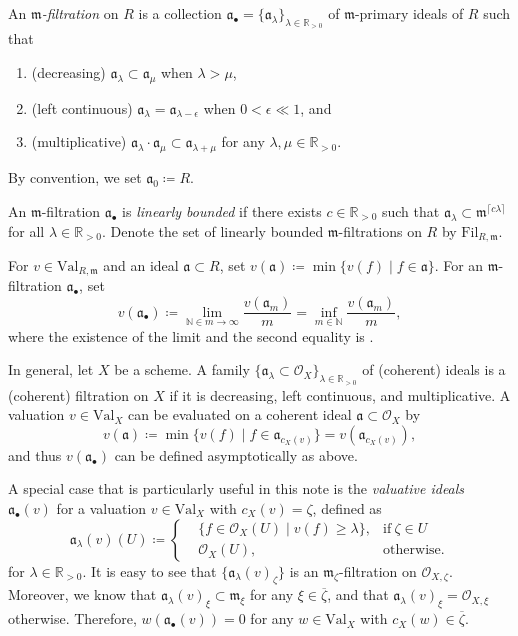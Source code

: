 \documentclass[11pt, leqno]{amsart}%
\theoremstyle{plain}
\theoremstyle{definition}
\newtheorem{definition}[theorem]{Definition}
\theoremstyle{remark}
\newcommand{\cO}{\mathcal{O}}
\newcommand{\bN}{\mathbb{N}}
\newcommand{\bR}{\mathbb{R}}
\newcommand{\fa}{\mathfrak{a}}
\newcommand{\fm}{\mathfrak{m}}
\newcommand{\Val}{\mathrm{Val}}
\newcommand{\R}{\mathbb{R}}
\newcommand{\la}{\lambda}
\newcommand{\Fil}{\mathrm{Fil}}
\begin{document}
An \emph{$\fm$-filtration} on $R$ is a collection $\fa_\bullet =\{\fa_\la \}_{\la \in \R_{>0}}$  of $\fm$-primary ideals of $R$ such that
\begin{enumerate}
\item (decreasing) $\fa_\la \subset \fa_{\mu}$ when  $\la >\mu$,
\item (left continuous) $\fa_{\la} = \fa_{\la-\epsilon}$ when $0<\epsilon\ll1$, and
\item (multiplicative) $\fa_{\la} \cdot \fa_{\mu} \subset \fa_{\la+ \mu}$ for any $\lambda,\mu\in\bR_{>0}$.
\end{enumerate}
By convention, we set $\fa_{0}\coloneqq R$.  

An $\fm$-filtration $\fa_\bullet$ is \emph{linearly bounded} if there exists $c\in\bR_{>0}$ such that $\fa_{\la} \subset \fm^{\lceil c  \la \rceil }$ for all $\la\in \bR_{>0}$. 
Denote the set of linearly bounded $\fm$-filtrations on $R$ by $\Fil_{R,\fm}$. 


For $v\in \Val_{R,\fm}$ and an ideal $\fa\subset R$, set
$v(\fa)\coloneqq \min\{v(f)\mid f\in\fa\}$.
For an $\fm$-filtration $\fa_\bullet$,  set
\[
v(\fa_\bullet)\coloneqq  \lim_{ \bN\in m \to \infty} \frac{ v(\fa_m)}{m} = \inf_{m\in \bN} \frac{v(\fa_m)}{m} , 
\]
where the existence of the limit and the second equality is \cite[Lemma 2.3]{JM-val-ideal-seq}. 


\medskip

In general, let $X$ be a scheme. A family $\{\fa_\lambda\subset\cO_X\}_{\lambda\in\bR_{>0}}$ of (coherent) ideals is a (coherent) filtration on $X$ if it is decreasing, left continuous, and multiplicative. 
A valuation $v\in\Val_X$ can be evaluated on a coherent ideal $\fa\subset \cO_X$ by
\[
    v(\fa)\coloneqq\min\{v(f)\mid f\in\fa_{c_X(v)}\}=v(\fa_{c_X(v)}),
\]
and thus $v(\fa_\bullet)$ can be defined asymptotically as above. 

A special case that is particularly useful in this note is the \emph{valuative ideals} $\fa_\bullet(v)$ for a valuation $v\in\Val_X$ with $c_X(v)=\zeta$, defined as
\[
    \fa_\lambda(v)(U)\coloneqq\left\{\begin{aligned}
        &\{f\in \cO_X(U)\mid v(f)\ge \lambda\}, &\text{if}~ \zeta\in U\\
        &\cO_X(U), &\text{otherwise}.
    \end{aligned}\right.
\]
for $\lambda\in\bR_{>0}$. It is easy to see that $\{\fa_\lambda(v)_\zeta\}$ is an $\fm_\zeta$-filtration on $\cO_{X,\zeta}$. 
Moreover, we know that $\fa_\lambda(v)_\xi\subset\fm_{\xi}$ for any $\xi\in\overline{\zeta}$, and that $\fa_\lambda(v)_\xi=\cO_{X,\xi}$ otherwise. 
Therefore, $w(\fa_\bullet(v))=0$ for any $w\in\Val_X$ with $c_X(w)\in\overline\zeta$. 
\end{document}

